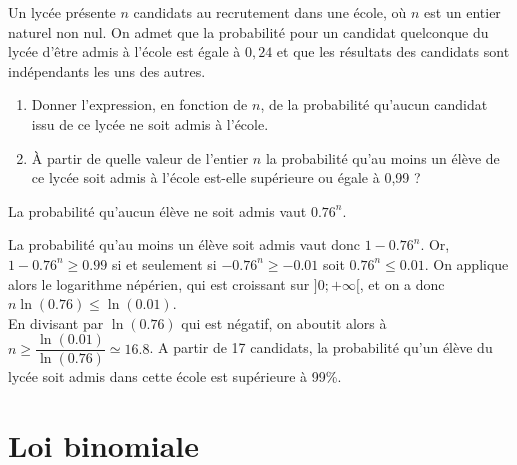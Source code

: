 \documentclass[11pt,fleqn, openany]{book} %
\begin{document}
\begin{exercise}Un lycée présente $n$ candidats au recrutement dans une école, où $n$ est un entier naturel non nul.
On admet que la probabilité pour un candidat quelconque du lycée d'être admis à l'école
est égale à $0,24$ et que les résultats des candidats sont indépendants les uns des autres.
\begin{enumerate}
\item Donner l'expression, en fonction de $n$, de la probabilité qu'aucun candidat issu de ce
lycée ne soit admis à l'école.
\item À partir de quelle valeur de l'entier $n$ la probabilité qu'au moins un élève de ce lycée
soit admis à l'école est-elle supérieure ou égale à 0,99 ?\end{enumerate}\end{exercise}

\begin{solution}La probabilité qu'aucun élève ne soit admis vaut $0.76^n$.

La probabilité qu'au moins un élève soit admis vaut donc $1-0.76^n$. Or, $1-0.76^n \geqslant 0.99$ si et seulement si $-0.76^n \geqslant -0.01$ soit $0.76^n \leqslant 0.01$. On applique alors le logarithme népérien, qui est croissant sur $]0;+\infty[$, et on a donc $n \ln(0.76) \leqslant \ln(0.01)$. \\ En divisant par $\ln\left(0.76\right)$ qui est négatif, on aboutit alors à $n \geqslant \dfrac{\ln(0.01)}{\ln(0.76)}\simeq 16.8$. A partir de 17 candidats, la probabilité qu'un élève du lycée soit admis dans cette école est supérieure à 99\%.\end{solution}




\section*{Loi binomiale}
\end{document}
